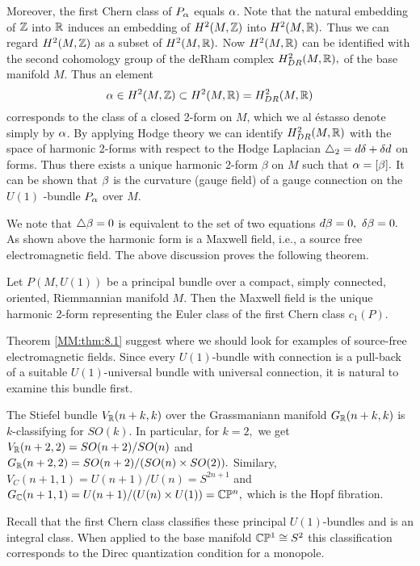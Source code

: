 Moreover, the first Chern class of $P_{\alpha}$ equals $\alpha$. Note that the natural embedding of $\mathbb Z$ into $\mathbb R$ induces
an embedding of $H^{2}(M, \mathbb Z)$ into $H^{2}(M, \mathbb R).$ Thus we can regard $H^{2}(M, \mathbb Z)$ as a subset of $H^{2}(M, \mathbb R).$
Now $H^{2}(M, \mathbb R)$ can be identified with the second cohomology group of the deRham complex $H^{2}_{DR}(M, \mathbb R),$ of the
base manifold $M$. Thus an element
$$
\alpha \in H^{2}(M, \mathbb Z) \subset H^{2}(M, \mathbb R) = H^{2}_{DR}(M, \mathbb R)
$$
corresponds to the class of a closed 2-form on $M$, which we al éstasso denote simply by $\alpha$. By applying Hodge
theory we can identify $H^{2}_{DR}(M, \mathbb R)$ with the space of harmonic 2-forms with respect to the Hodge Laplacian 
$\triangle_{2}=d \delta + \delta d$ on forms. Thus there exists a unique harmonic 2-form $\beta$ on $M$ such that $\alpha =
[\beta].$ It can be shown that $\beta$ is the curvature (gauge field) of a gauge connection on the $U(1)$
-bundle $P_{\alpha}$ over $M.$

We note that $\triangle \beta =0$ is equivalent to the set of two equations $d \beta =0, \ \delta \beta =0.$ As shown above the
harmonic form is a Maxwell field, i.e., a source free electromagnetic field. The above discussion proves the following
theorem.

\begin{thm}
 \label{MM:thm:8.1}
Let $P(M, U(1))$ be a principal bundle over a compact, simply connected, oriented, Riemmannian manifold $M$. Then the
Maxwell field is the unique harmonic 2-form representing the Euler class of the first Chern class $c_{1}(P). $
\end{thm}

Theorem \ref{MM:thm:8.1} suggest where we should look for examples of  source-free electromagnetic fields. Since every
$U(1)$-bundle with connection is a pull-back of a suitable $U(1)$-universal bundle with universal connection, it is
natural to examine this bundle first. 

The Stiefel bundle $V_{\mathbb R}(n+k,k)$ over the Grassmaniann manifold $G_{\mathbb R}(n+k,k)$ is $k$-classifying for $SO(k).$ In
particular, for $k=2,$ we get $V_{\mathbb R}(n+2,2)=SO(n+2)/SO(n)$ and $G_{\mathbb R}(n+2,2)=SO(n+2)/(SO(n)\times SO(2)).$ Similary,
$V_{C}(n+1,1)=U(n+1)/U(n)=S^{2n+1}$ and $G_{\mathbb C}(n+1,1)=U(n+1)/(U(n)\times U(1))=\mathbb C \mathbb{P}^{n},$ which is the Hopf fibration. 

Recall that the first Chern class classifies these principal $U(1)$-bundles and is an integral class. When applied to
the base manifold $\mathbb C \mathbb{P}^{1}\cong S^{2}$ this classification corresponds to the Direc quantization condition for a
monopole. 

